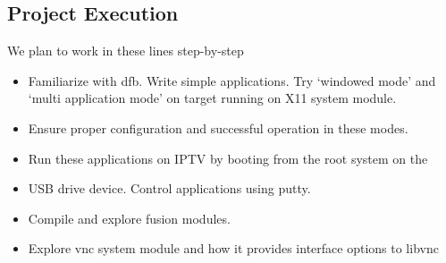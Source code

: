 \subsection{Project Execution}
We plan to work in these lines step-by-step
\begin{itemize}
\item Familiarize with dfb. Write simple applications. Try `windowed mode’ and `multi application mode’ on target running on X11 system module.
\item Ensure proper configuration and successful operation in these modes.
\item Run these applications on IPTV by booting from the root system on the
\item USB drive device. Control applications using putty.
\item Compile and explore fusion modules.
\item Explore vnc system module and how it provides interface options to libvnc

\end{itemize}
